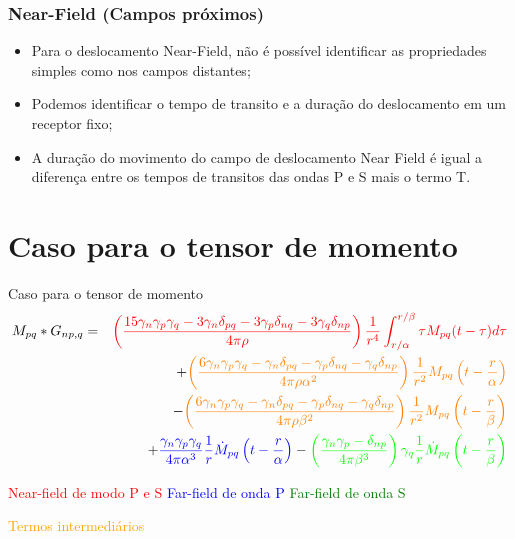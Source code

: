 \documentclass{beamer}
\begin{document}
\begin{frame}
	\frametitle {Near-Field (Campos próximos)}
	\begin{itemize}
		\item Para o deslocamento Near-Field, não é possível identificar as propriedades simples como nos campos distantes; 
		\item Podemos identificar o tempo de transito e a duração do deslocamento em um receptor fixo;
		\item A duração do movimento do campo de deslocamento Near Field é igual a diferença entre os tempos de transitos das ondas P e S mais o termo T.
	\end{itemize}
\end{frame}

\section{Caso para o tensor de momento}

\begin{frame}{Caso para o tensor de momento}
	\small
	\begin{eqnarray}
	M_{pq} \ast G_{np,q} &=&\textcolor{red}{\left(\frac{15\gamma_n\gamma_p\gamma_q-3\gamma_n\delta_{pq}-3\gamma_p\delta_{nq}-3\gamma_{q}\delta_{np}}{4\pi\rho}\right)\frac{1}{r^4}\int_{r/\alpha}^{r/\beta} \tau M_{pq}(t-\tau) d\tau} \nonumber \\
	&&+ \textcolor{orange}{\left(\frac{6\gamma_n\gamma_p\gamma_q-\gamma_n\delta_{pq}-\gamma_p\delta_{nq}-\gamma_{q}\delta_{np}}{4\pi\rho\alpha^2}\right)\frac{1}{r^2}M_{pq}\left(t-\frac{r}{\alpha}\right)} \nonumber \\
	&&-
	\textcolor{orange}{\left(\frac{6\gamma_n\gamma_p\gamma_q-\gamma_n\delta_{pq}-\gamma_p\delta_{nq}-\gamma_{q}\delta_{np}}{4\pi\rho\beta^2}\right)\frac{1}{r^2}M_{pq}\left(t-\frac{r}{\beta}\right)} \nonumber \\
	&&+\textcolor{blue}{ \frac{\gamma_n \gamma_p \gamma_q}{4\pi\alpha^3}\frac{1}{r}\dot{M}_{pq}\left(t-\frac{r}{\alpha}\right)}- \textcolor{green}{\left(\frac{\gamma_n\gamma_p-\delta_{np}}{4\pi\beta^3}\right)\gamma_{q}\frac{1}{r}\dot{M}_{pq}\left(t-\frac{r}{\beta}\right)} \nonumber
	\end{eqnarray}
	\begin{flushleft}
		\textcolor{red}{Near-field de modo P e S} \hspace{0.5cm}
		\textcolor{blue}{Far-field de onda P}\hspace{0.5cm}
		\textcolor{green}{Far-field de onda S}
	\end{flushleft}
    \begin{center}
    	\textcolor{orange}{Termos intermediários}
    \end{center}
\end{frame}
\end{document}
